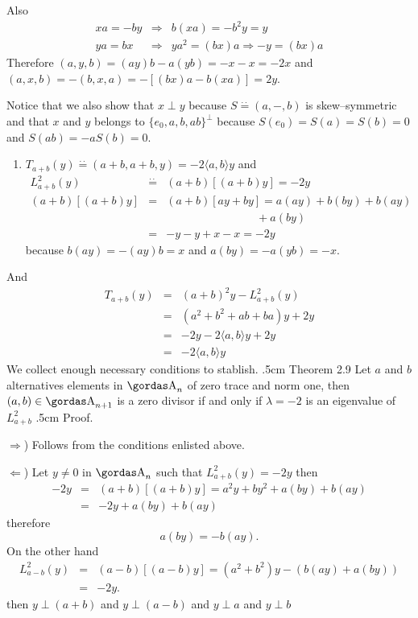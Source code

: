 Also
\begin{eqnarray*}
xa=-by&\Rightarrow&b(xa)=-b^{2}y=y\\
ya=bx&\Rightarrow&ya^{2}=(bx)a\Rightarrow -y=(bx)a
\end{eqnarray*}
Therefore $(a,y,b)=(ay)b-a(yb)=-x-x=-2x$ and
$(a,x,b)=-(b,x,a)=-[(bx)a-b(xa)]=2y$.
\par 
Notice that we also show that $x\perp y$ because 
$S\stackrel{\cdot\cdot}{=}(a,-,b)$ is skew--symmetric and that $x$ and $y$
belongs to $\{e_{0},a,b,ab\}^{\perp}$ because 
$S(e_{0})=S(a)=S(b)=0$ and $S(ab)=-aS(b)=0$.
\begin{enumerate}
\item[5)]$T_{a+b}(y)\stackrel{\cdot\cdot}{=}(a+b,a+b,y)=-2\langle a,b\rangle y$
and
\begin{eqnarray*}
L^{2}_{a+b}(y)&\stackrel{\cdot\cdot}{=}&(a+b)[(a+b)y]=-2y\\
(a+b)[(a+b)y]&=&(a+b)[ay+by]=a(ay)+b(by)+b(ay)\\
&&\qquad\qquad\qquad\qquad +a(by)\\
&=&-y-y+x-x=-2y
\end{eqnarray*}
because $b(ay)=-(ay)b=x$ and $a(by)=-a(yb)=-x$.
\end{enumerate}
And 
\begin{eqnarray*}
T_{a+b}(y)&=&(a+b)^{2}y-L^{2}_{a+b}(y)\\
&=&(a^{2}+b^{2}+ab+ba)y+2y\\
&=&-2y-2\langle a,b\rangle y+2y\\
&=&-2\langle a,b\rangle y
\end{eqnarray*}
We collect enough necessary conditions to stablish.
\vglue.5cm
\noindent
{\bsbf Theorem 2.9} Let $a$ and $b$ alternatives elements in $\a_{n}$ of
zero trace and norm one, then $(a,b)\in \a_{n+1}$ is a zero divisor if and only
if $\lambda=-2$ is an eigenvalue of $L^{2}_{a+b}$
\vglue.5cm
\noindent
{\bsbf Proof.}
\par 
$\Rightarrow$) Follows from the conditions enlisted above.
\par 
$\Leftarrow$) Let $y\neq 0$ in $\a_{n}$ such that $L^{2}_{a+b}(y)=-2y$ then
\begin{eqnarray*}
-2y&=&(a+b)[(a+b)y]=a^{2}y+by^{2}+a(by)+b(ay)\\
&=&-2y+a(by)+b(ay)
\end{eqnarray*}
therefore 
$$a(by)=-b(ay).$$
On the other hand
\begin{eqnarray*}
L^{2}_{a-b}(y)&=&(a-b)[(a-b)y]=(a^{2}+b^{2})y-(b(ay)+a(by))\\
&=&-2y.
\end{eqnarray*}
then $y\perp (a+b)$ and $y\perp(a-b)$ and $y\perp a$ and $y\perp b$

